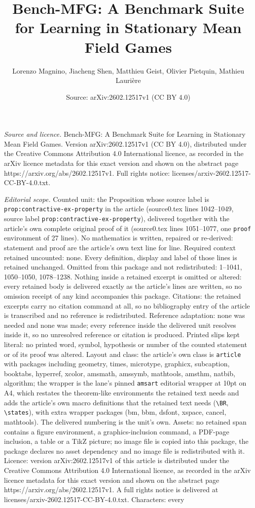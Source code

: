 \documentclass[10pt,a4paper]{amsart}
\title[Bench-MFG: A Benchmark Suite for Learning in Stationary Mean]{Bench-MFG: A Benchmark Suite for Learning in Stationary Mean Field Games}
\author{Lorenzo Magnino, Jiacheng Shen, Matthieu Geist, Olivier Pietquin, Mathieu Lauri\`ere}
\date{Source: arXiv:2602.12517v1 (CC BY 4.0)}
\begin{document}
\maketitle

\noindent\emph{Source and licence.} Bench-MFG: A Benchmark Suite for Learning in Stationary Mean Field Games. Version arXiv:2602.12517v1 (CC BY 4.0), distributed under the Creative Commons Attribution 4.0 International licence, as recorded in the arXiv licence metadata for this exact version and shown on the abstract page https://arxiv.org/abs/2602.12517v1. Full rights notice: licenses/arxiv-2602.12517-CC-BY-4.0.txt.\par\smallskip

\noindent\textit{Editorial scope.} Counted unit: the Proposition whose source label is \texttt{prop:contractive-ex-property} in the article (source0.tex lines 1042--1049, source label \texttt{prop:contractive-ex-property}), delivered together with the article's own complete original proof of it (source0.tex lines 1051--1077, one \texttt{proof} environment of 27 lines). No mathematics is written, repaired or re-derived: statement and proof are the article's own text line for line. Required context retained uncounted: none. Every definition, display and label of those lines is retained unchanged. Omitted from this package and not redistributed: 1--1041, 1050--1050, 1078--1238. Nothing inside a retained excerpt is omitted or altered: every retained body is delivered exactly as the article's lines are written, so no omission receipt of any kind accompanies this package. Citations: the retained excerpts carry no citation command at all, so no bibliography entry of the article is transcribed and no reference is redistributed. Reference adaptation: none was needed and none was made; every reference inside the delivered unit resolves inside it, so no unresolved reference or citation is produced. Printed slips kept literal: no printed word, symbol, hypothesis or number of the counted statement or of its proof was altered. Layout and class: the article's own class is \texttt{article} with packages including geometry, times, microtype, graphicx, subcaption, booktabs, hyperref, xcolor, amsmath, amssymb, mathtools, amsthm, natbib, algorithm; the wrapper is the lane's pinned \texttt{amsart} editorial wrapper at 10pt on A4, which restates the theorem-like environments the retained text needs and adds the article's own macro definitions that the retained text needs (\texttt{\textbackslash BR}, \texttt{\textbackslash states}), with extra wrapper packages (bm, bbm, dsfont, xspace, cancel, mathtools). The delivered numbering is the unit's own. Assets: no retained span contains a figure environment, a graphics-inclusion command, a PDF-page inclusion, a table or a TikZ picture; no image file is copied into this package, the package declares no asset dependency and no image file is redistributed with it. Licence: version arXiv:2602.12517v1 of this article is distributed under the Creative Commons Attribution 4.0 International licence, as recorded in the arXiv licence metadata for this exact version and shown on the abstract page https://arxiv.org/abs/2602.12517v1. A full rights notice is delivered at licenses/arxiv-2602.12517-CC-BY-4.0.txt. Characters: every 
\end{document}
